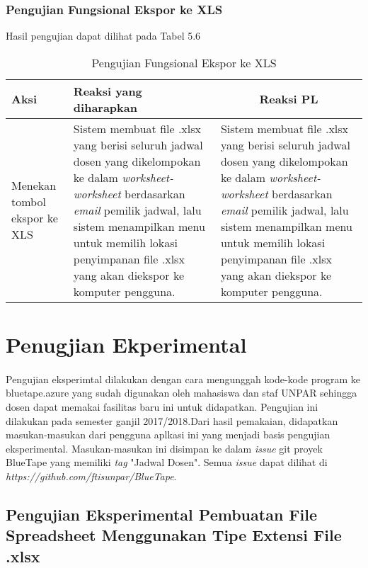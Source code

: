 \subsubsection{Pengujian Fungsional Ekspor ke XLS}
Hasil pengujian dapat dilihat pada Tabel 5.6
\begin{center}
	\begin{table}[H]
		\begin{tabular}{|p{5cm}|p{5cm}|p{5cm}|}
		\hline
		\centering Aksi	& 	\centering Reaksi yang diharapkan &  \multicolumn{1}{c|}{Reaksi PL} \\
		\hline
		Menekan tombol ekspor ke XLS & 
		Sistem membuat file .xlsx yang berisi seluruh jadwal dosen yang dikelompokan ke dalam \textit{worksheet-worksheet} berdasarkan \textit{email} pemilik jadwal, lalu sistem  menampilkan menu untuk memilih lokasi penyimpanan file .xlsx yang akan diekspor ke komputer pengguna. &
		Sistem membuat file .xlsx yang berisi seluruh jadwal dosen yang dikelompokan ke dalam \textit{worksheet-worksheet} berdasarkan \textit{email} pemilik jadwal, lalu sistem  menampilkan menu untuk memilih lokasi penyimpanan file .xlsx yang akan diekspor ke komputer pengguna. \\
		\hline
		\end{tabular}
		\caption{Pengujian Fungsional Ekspor ke XLS}
	\end{table}
\end{center}


\section{Penugjian Ekperimental}
\paragraph{}Pengujian eksperimtal dilakukan dengan cara mengunggah kode-kode program ke bluetape.azure yang sudah digunakan oleh mahasiswa dan staf UNPAR sehingga dosen dapat memakai fasilitas baru ini untuk didapatkan. Pengujian ini dilakukan pada semester ganjil 2017/2018.Dari hasil pemakaian, didapatkan masukan-masukan dari pengguna aplkasi ini yang menjadi basis pengujian eksperimental.
Masukan-masukan ini disimpan ke dalam \textit{issue} git proyek BlueTape yang memiliki \textit{tag} "Jadwal Dosen". Semua \textit{issue} dapat dilihat di \textit{https://github.com/ftisunpar/BlueTape}.

\subsection{Pengujian Eksperimental Pembuatan File Spreadsheet Menggunakan Tipe Extensi File .xlsx}
